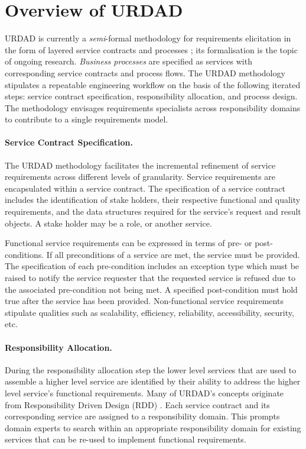 \section{Overview of URDAD 
\label{sec:urdadMethodology}}

URDAD is currently a \emph{semi}-formal methodology for requirements elicitation in the form of layered service contracts and processes  \cite{solms_urdad_2010}; its formalisation is the topic of ongoing research. \emph{Business processes} are specified as services with corresponding service contracts and process flows. The URDAD methodology stipulates a repeatable engineering workflow on the basis of the following iterated steps: service contract specification, responsibility allocation, and process design. The methodology envisages requirements specialists across responsibility domains to contribute to a single requirements model.

\paragraph{Service Contract Specification.} The URDAD methodology facilitates the incremental refinement of service requirements across different levels of granularity. Service requirements are encapsulated within a service contract. The specification of a service contract includes the identification of stake holders, their respective functional and quality requirements, and the data structures required for the service's request and result objects. A stake holder may be a role, or another service.

Functional service requirements can be expressed in ter\-ms of pre- or post-conditions. If all preconditions of a service are met, the service must be provided. The specification of each pre-condition includes an exception type which must be raised to notify the service requester that the requested service is refused due to the associated pre-condition not being met. A specified post-condition must hold true after the service has been provided. Non-functio\-nal service requirements stipulate qualities such as scalability, efficiency, reliability, accessibility, security, etc.

\paragraph{Responsibility Allocation.} During the responsibility allocation step the lower level services that are used to assemble a higher level service are identified by their ability to address the higher level service's functional requirements. Many of URDAD's concepts originate from Responsibility Driven Design (RDD) \cite{wirfs-brock_object-oriented_1989,wirfs-brock_object_2002}. Each service contract and its corresponding service are assigned to a responsibility domain. This prompts domain experts to search within an appropriate responsibility domain for existing services that can be re-used to implement functional requirements.

